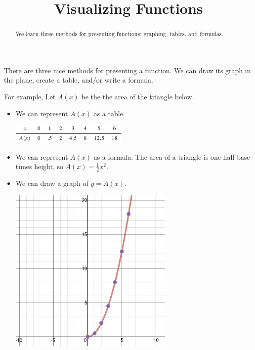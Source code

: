 \documentclass{ximera}
\title{Visualizing Functions}
\begin{document}
\begin{abstract}
We learn three methods for presenting functions: graphing, tables, and formulas.
\end{abstract}
\maketitle

There are three nice methods for presenting a function. We can draw its graph in the plane, create a table, and/or write a formula.

For example, Let $A(x)$ be the the area of the triangle below.
\begin{image}
\end{image}
\begin{itemize}
\item We can represent $A(x)$ as a table.
\begin{image}
\includegraphics{IntroToFunctionsTable1.png}
\end{image}
\item
We can represent $A(x)$ as a formula. The area of a triangle is one half base times height, so $A(x)=\frac{1}{2}x^2$.
\item We can draw a graph of $y=A(x)$.
\begin{image}
\includegraphics[width=8cm]{TriangleArea.png}
\end{image}
\end{itemize}
\end{document}

